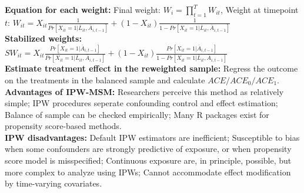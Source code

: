 \documentclass[a4paper,7pt,landscape]{extarticle}
\begin{document}
\begin{multicols}{3}
\begin{boxA}
\textbf{Equation for each weight:} Final weight: $W_i = \prod_{t=1}^T W_{it}$, Weight at timepoint $t$: $W_{it} = X_{it} \frac{1}{Pr[X_{it} = 1 | \overline{L}_{it}, \overline{A}_{i,t-1}]}+(1-X_{it}) \frac{1}{1 - Pr[X_{it} = 1 | \overline{L}_{it}, \overline{A}_{i,t-1}]}$\\
\textbf{Stabilized weights:} $SW_{it} = X_{it} \frac{Pr[X_{it} = 1 | \overline{A}_{i,t-1}]}{Pr[X_{it} = 1 | \overline{L}_{it}, \overline{A}_{i,t-1}]}+(1-X_{it}) \frac{Pr[X_{it} = 1 | \overline{A}_{i,t-1}]}{1 - Pr[X_{it} = 1 | \overline{L}_{it}, \overline{A}_{i,t-1}]}$\\
\textbf{Estimate treatment effect in the reweighted sample:} Regress the outcome on the treatments in the balanced sample and calculate $ACE/ACE_0/ACE_1$.\\
\textbf{Advantages of IPW-MSM:} Researchers perceive this method as relatively simple; IPW procedures seperate confounding control and effect estimation; Balance of sample can be checked empirically; Many R packages exist for propensity score-based methods.\\
\textbf{IPW disadvantages:} Default IPW estimators are inefficient; Susceptible to bias when some confounders are strongly predictive of exposure, or when propensity score model is misspecified; Continuous exposure are, in principle, possible, but more complex to analyze using IPWs; Cannot accommodate effect modification by time-varying covariates.

\end{boxA}


\end{multicols}
\end{document}
